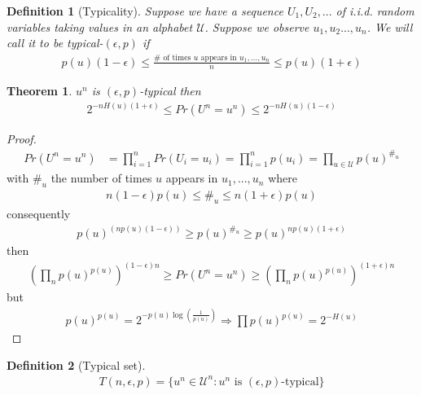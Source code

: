 \documentclass{article}
\newtheorem{theorem}{Theorem}[section]
\newtheorem{definition}{Definition}[section]
\theoremstyle{definition} %
\def\U{\mathcal{U}}
\begin{document}
\begin{definition}[Typicality]
  \label{def:typicality}
Suppose we have a sequence $U_1, U_2, ...$ of i.i.d. random variables taking values in an alphabet $\U$.
Suppose we observe $u_1,u_2..., u_n$. We will call it to be \textit{typical-$(\epsilon, p)$} if
\begin{align*}
  p(u) (1 - \epsilon)
  \leq \frac{\# \text{ of times $u$ appears in $u_1, ..., u_n$}}{n}
  \leq p(u)(1+\epsilon)
\end{align*}
\end{definition}

\begin{theorem}
  $u^n$ is $(\epsilon, p)$-typical then
  \begin{align*}
    2^{-n H(u)(1 + \epsilon)}
    \leq Pr(U^n = u^n)
    \leq 2^{-n H(u)(1 - \epsilon)}
  \end{align*}
\end{theorem}

\begin{proof}
  \begin{align*}
    Pr(U^n = u^n) &= \prod_{i=1}^n Pr(U_i = u_i) = \prod_{i=1}^n p(u_i) = \prod_{u \in \U} p(u)^{\#_u}
  \end{align*}
  with $\#_u$ the number of times $u$ appears in $u_1, ..., u_n$ where
  \begin{align*}
    n (1-\epsilon) p(u) \leq \#_u \leq n(1+\epsilon)p(u)
  \end{align*}
  consequently
  \begin{align*}
    p(u)^{(n p(u)(1-\epsilon))} \geq p(u)^{\#_u} \geq p(u)^{n p(u)(1+\epsilon)}
  \end{align*}
  then
  \begin{align*}
    (\prod_{n} p(u)^{p(u)})^{(1-\epsilon)n}
    \geq Pr(U^n = u^n)
    \geq (\prod_{n} p(u)^{p(u)})^{(1+\epsilon)n}
  \end{align*}
  but
  \begin{align*}
    p(u)^{p(u)} = 2^{-p(u) \log(\frac{1}{p(u)})} \Rightarrow \prod p(u)^{p(u)} = 2^{-H(u)}
  \end{align*}
\end{proof}

\begin{definition}[Typical set]
  \begin{align*}
    T(n, \epsilon, p) = \{ u^n \in \U^n : u^n \text{ is } (\epsilon, p)\text{-typical}\}
  \end{align*}
\end{definition}
\end{document}
